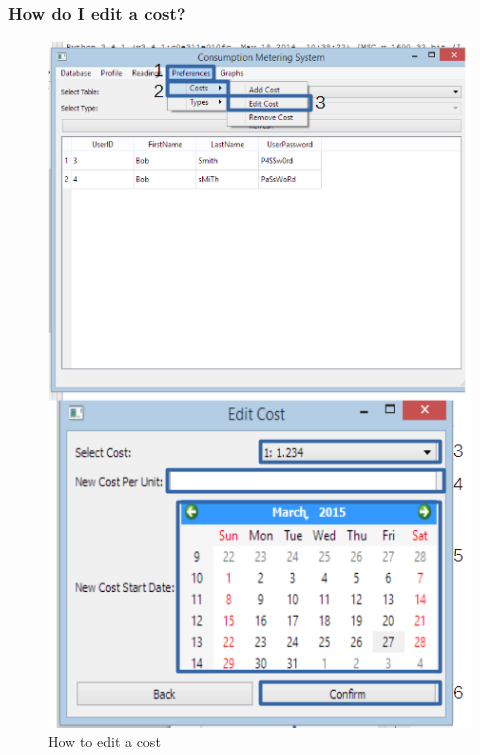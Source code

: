 \subsubsection{How do I edit a cost?}\label{question:edit_cost}
\begin{figure}[H]
	\includegraphics{./manual/images/edit_cost.png}
	\caption{How to edit a cost}
\end{figure}


